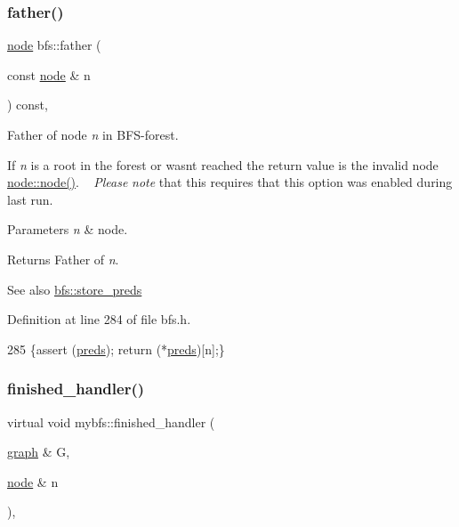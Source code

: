 \subsubsection{\texorpdfstring{father()}{father()}}
{\footnotesize\ttfamily \mbox{\hyperlink{classnode}{node}} bfs\+::father (\begin{DoxyParamCaption}\item[{const \mbox{\hyperlink{classnode}{node}} \&}]{n }\end{DoxyParamCaption}) const\hspace{0.3cm}{\ttfamily [inline]}, {\ttfamily [inherited]}}



Father of node {\itshape n} in B\+F\+S-\/forest. 

If {\itshape n} is a root in the forest or wasn\textquotesingle{}t reached the return value is the invalid node \mbox{\hyperlink{classnode_a6da4ea35f222059db9a59cf40be459f9}{node\+::node()}}. ~\newline
 {\itshape Please} {\itshape note} that this requires that this option was enabled during last run.


\begin{DoxyParams}{Parameters}
{\em n} & node. \\
\hline
\end{DoxyParams}
\begin{DoxyReturn}{Returns}
Father of {\itshape n}. 
\end{DoxyReturn}
\begin{DoxySeeAlso}{See also}
\mbox{\hyperlink{classbfs_a8c7ce0ea2cd8e1932d1da5693d90cf61}{bfs\+::store\+\_\+preds}} 
\end{DoxySeeAlso}


Definition at line 284 of file bfs.\+h.


\begin{DoxyCode}
285     \{assert (\mbox{\hyperlink{classbfs_a3bac5ed333bb78a30a67099c3b94aa0c}{preds}}); \textcolor{keywordflow}{return} (*\mbox{\hyperlink{classbfs_a3bac5ed333bb78a30a67099c3b94aa0c}{preds}})[n];\}
\end{DoxyCode}
\mbox{\label{classmybfs_a6e1c4d4e0b68caf0e3b7cc14d15da537}} 
\subsubsection{\texorpdfstring{finished\+\_\+handler()}{finished\_handler()}}
{\footnotesize\ttfamily virtual void mybfs\+::finished\+\_\+handler (\begin{DoxyParamCaption}\item[{\mbox{\hyperlink{classgraph}{graph}} \&}]{G,  }\item[{\mbox{\hyperlink{classnode}{node}} \&}]{n }\end{DoxyParamCaption})\hspace{0.3cm}{\ttfamily [inline]}, {\ttfamily [virtual]}}




